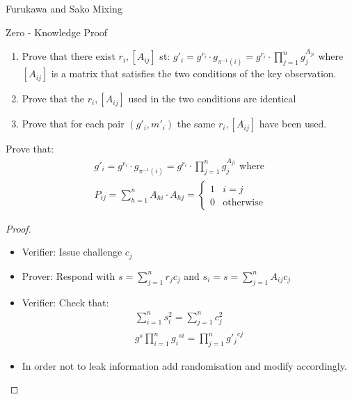 \documentclass{beamer}
\begin{document}
\begin{frame}[allowframebreaks]{Furukawa and Sako Mixing \cite{FS01}}
\begin{itemize}
\begin{block} {Zero - Knowledge Proof}
\begin{enumerate}
\item Prove that there exist $r_i, [A_{ij}]$ st: $g'_i = g^{r_i} \cdot g_{\pi^{-1}(i)} = g^{r_i} \cdot \prod_{j=1}^{n} g_j ^ {A_{ji}}$
where $[A_{ij}]$ is a matrix that satisfies the two conditions of the key observation.
\item Prove that the $r_i, [A_{ij}]$ used in the two conditions are identical
\item Prove that for each pair  $(g'_i,m'_i)$ the same $r_i, [A_{ij}]$ have been used.
\end{enumerate}
\end{block}

\framebreak

\begin{block}{Prove that:}
\begin{align*}
g'_i = g^{r_i} \cdot g_{\pi^{-1}(i)} = g^{r_i} \cdot \prod_{j=1}^{n} g_j ^ {A_{ji}}  \text{ where } \\
P_{ij} = \sum_{h=1}^{n} A_{hi} \cdot A_{hj} = \begin{cases} 1 & i=j \\ 0 & \text{otherwise} \end{cases}
\end{align*}
\end{block}

\begin{proof}
\begin{itemize}
\item Verifier: Issue challenge $c_j$
\item Prover: Respond with 
$s = \sum_{j=1}^{n}	r_jc_j$ and $s_i = s = \sum_{j=1}^{n}A_{ij}c_j$
\item Verifier:
Check that: 
\begin{align*}
 \sum_{i=1}^{n} s_{i}^{2} = \sum_{j=1}^{n} c_{j}^{2}  \\
g^s \prod_{i=1}^{n} {g_{i}}^{si} = \prod_{j=1}^{n} {g'_{j}}^{cj}
\end{align*}
\item In order not to leak information add randomisation and modify accordingly.
\end{itemize}
\end{proof}

\end{itemize}
\end{frame}
\end{document}

